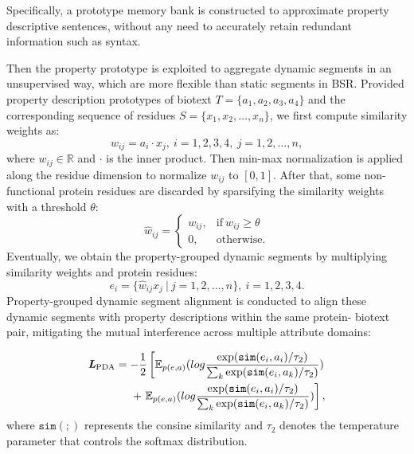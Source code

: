 Specifically, a prototype memory bank is constructed to approximate property descriptive sentences, without any need to accurately retain redundant information such as syntax. 

Then the property prototype is exploited to aggregate dynamic segments in an unsupervised way, which are more flexible than static segments in BSR.  
Provided property description prototypes of biotext $T=\{a_1, a_2, a_3, a_4\}$ and the corresponding sequence of residues $S=\{x_1, x_2, \dots, x_n\}$, we first compute similarity weights as:
\begin{equation}
    w_{ij}=a_i \cdot x_j,~i=1,2,3,4,~j=1,2,\dots,n,
\end{equation}
where $w_{ij} \in \mathbb{R}$ and $\cdot$ is the inner product.
Then min-max normalization is applied along the residue dimension to normalize $w_{ij}$ to $[0,1]$. After that, some non-functional protein residues are discarded by sparsifying the similarity weights with a threshold $\theta$:
\begin{equation}
    \hat{w}_{ij}=
    \begin{cases}
        w_{ij}, & \text{if}~w_{ij} \geq \theta \\
        0, & \text{otherwise}.
    \end{cases}
\end{equation}
Eventually, we obtain the property-grouped dynamic segments by multiplying similarity weights and protein residues:
\begin{equation}
    e_i = \{\hat{w}_{ij} x_{j}~|~j=1,2,\dots,n\},~i=1,2,3,4.
\end{equation}
Property-grouped dynamic segment alignment is conducted to align these dynamic segments with property descriptions within the same protein-
biotext pair, mitigating the mutual interference across multiple attribute domains:

\begin{equation}
\begin{split}
    \textit{\textbf{L}}_{\text{PDA}} = -\frac{1}{2} \left[ \mathbb{E}_{p(e,a)}(log\frac{\exp(\mathtt{sim}(e_i, a_i)/\tau_2)}{\sum_{k} \exp(\mathtt{sim}(e_i, a_k)/\tau_2)}) \right. \\
    \left. +~\mathbb{E}_{p(e,a)}(log\frac{\exp(\mathtt{sim}(e_i, a_i)/\tau_2)}{\sum_{k} \exp(\mathtt{sim}(e_i, a_k)/\tau_2)}) \right ],
\end{split}
\end{equation}
where $\mathtt{sim}(;)$ represents the consine similarity and $\tau_2$ denotes the temperature parameter that controls the softmax distribution.

